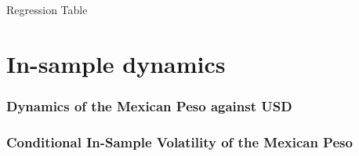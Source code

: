 \documentclass{beamer}
\begin{document}
\begin{frame}{Regression Table}
\setlength\tabcolsep{2pt}  %
\tiny  %

\normalsize
\end{frame}


\section{In-sample dynamics}
\begin{frame}
\frametitle{Dynamics of the Mexican Peso against USD}
\end{frame}


\begin{frame}
\frametitle{Conditional In-Sample Volatility of the Mexican Peso}
\end{frame}
\end{document}
